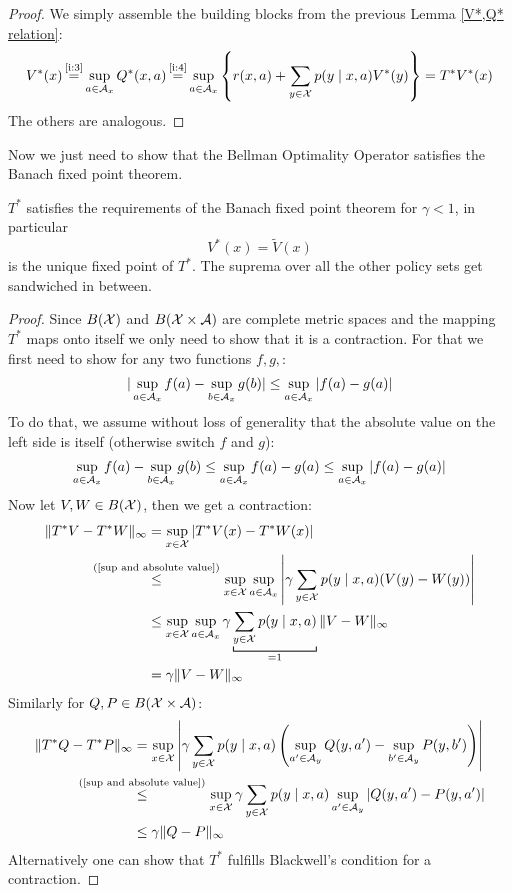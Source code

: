 \begin{proof}
	We simply assemble the building blocks from the previous Lemma \ref{V*,Q* relation}:
\begin{align*}
	V^*(x)\xeq{\text{\ref{i:3}}}\sup_{a\in\cA_x}Q^*(x,a)
	\xeq{\text{\ref{i:4}}}\sup_{a\in\cA_x}\left\{r(x,a)+\sum_{y\in\cX}p(y\mid x,a) V^*(y)\right\} =T^*V^*(x)
\end{align*}
The others are analogous.
\end{proof}

Now we just need to show that the Bellman Optimality Operator satisfies the Banach fixed point theorem.

\begin{thm}\label{T^* satisfies BFT}
\(T^*\) satisfies the requirements of the Banach fixed point theorem for \(\gamma<1\), in particular
	\[V^*(x)=\tilde{V}(x) \]
is the unique fixed point of \(T^*\). The suprema over all the other policy sets get sandwiched in between.
\end{thm}
\begin{proof}
	\parencite[79]{szepesvariAlgorithmsReinforcementLearning2010} 
	Since \(B(\mathcal{X})\) and \(B(\mathcal{X}\times\mathcal{A})\) are complete metric spaces and the mapping \(T^*\) maps onto itself we only need to show that it is a contraction. For that we first need to show for any two functions \(f,g,\):
	\begin{align}\label{sup and absolute value}
		|\sup_{a\in\mathcal{A}_x} f(a) -\sup_{b\in\mathcal{A}_x}g(b)| \le \sup_{a\in\mathcal{A}_x}|f(a)-g(a)|
	\end{align}
	To do that, we assume without loss of generality that the absolute value on the left side is itself (otherwise switch \(f\) and \(g\)):
	\begin{align*}
		\sup_{a\in\mathcal{A}_x} f(a) -\sup_{b\in\mathcal{A}_x}g(b) \le \sup_{a\in\mathcal{A}_x} f(a)- g(a)\le \sup_{a\in\mathcal{A}_x}|f(a)-g(a)|
	\end{align*}
	Now let \(V, W \in B(\mathcal{X}) \), then we get a contraction:
	\begin{align*}
		\|T^*V -T^*W\|_\infty
		&=\sup_{x\in\cX} |T^*V(x) -T^*W(x)|\\
		&\lxlq{\text{(\ref{sup and absolute value})}}\sup_{x\in\cX}\sup_{a\in\cA_x}
		\left|\gamma\sum_{y\in\cX}p(y\mid x,a) (V(y) -W(y))\right|\\
		&\le \sup_{x\in\cX}\sup_{a\in\cA_x} 
		\gamma\underbracket[0.7pt]{\sum_{y\in\cX}p(y\mid x,a)}_{=1} \|V-W\|_\infty\\
		&=\gamma \|V-W\|_\infty
	\end{align*}
	Similarly for \(Q, P\in B(\mathcal{X}\times\mathcal{A})\):
	\begin{align*}
		\|T^*Q -T^*P\|_\infty
		&=\sup_{x\in\cX} \left|\gamma \sum_{y\in\cX} p(y\mid x,a) 
		\left(\sup_{a'\in\cA_y}Q(y, a') -\sup_{b'\in\cA_y}P(y,b') \right) \right|\\
		&\lxlq{\text{(\ref{sup and absolute value})}}\sup_{x\in\cX} 
		\gamma \sum_{y\in\cX} p(y\mid x,a) \sup_{a'\in\cA_y} |Q(y, a')-P(y,a')|\\
		&\le \gamma \|Q-P\|_\infty \qedhere
	\end{align*}
	Alternatively one can show that \(T^*\) fulfills Blackwell's condition for a contraction. 
\end{proof}

